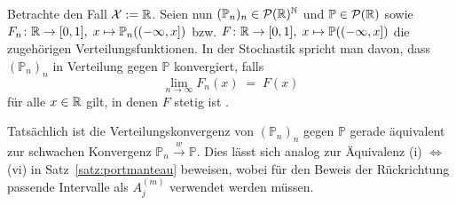 \documentclass[../thesis/thesis.tex]{subfiles}
\begin{document}
	\begin{Bemerkung}[Verteilungskonvergenz]
		Betrachte den Fall $\mathcal{X} := \mathbb{R}$. Seien nun $(\mathbb{P}_n)_n \in \mathcal{P}(\mathbb{R})^{\mathbb{N}}$ und $\mathbb{P} \in \mathcal{P}(\mathbb{R})$ sowie $F_n \colon \mathbb{R} \to [0, 1], \; x \mapsto \mathbb{P}_n((-\infty, x]) $ bzw. $F \colon \mathbb{R} \to [0, 1], \; x \mapsto \mathbb{P}((-\infty, x]) $ die zugehörigen Verteilungsfunktionen. In der Stochastik spricht man davon, dass $(\mathbb{P}_n)_n$ in Verteilung gegen $\mathbb{P}$ konvergiert, falls 
		\[ \lim_{n \to \infty} F_n(x) \; = \; F(x) \]
		für alle $x \in \mathbb{R}$ gilt, in denen $F$ stetig ist \cite[Definition 6.1]{Henze.2016}. 
		
		Tatsächlich ist die Verteilungskonvergenz von $(\mathbb{P}_n)_n$ gegen $\mathbb{P}$ gerade äquivalent zur schwachen Konvergenz $\mathbb{P}_n \xrightarrow{w} \mathbb{P}$. Dies lässt sich analog zur Äquivalenz (i) $\Leftrightarrow$ (vi) in Satz~\ref{satz:portmanteau} beweisen, wobei für den Beweis der Rückrichtung passende Intervalle als $A_j^{(m)}$ verwendet werden müssen.
	\end{Bemerkung}
	
\end{document}
